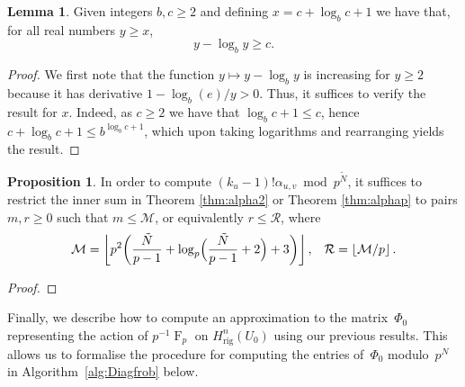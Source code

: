 \documentclass[a4paper,11pt]{article}
\numberwithin{equation}{section}
\providecommand{\floor}[1]{\left\lfloor#1\right\rfloor}   %
\DeclareMathOperator{\Frob}{F}           %
\providecommand{\Hrig}{H_{\text{rig}}}  %
\theoremstyle{definition}
\newtheorem{lem}[thm]{Lemma}
\newtheorem{prop}[thm]{Proposition}
\begin{document}
\begin{lem} \label{lem:log}
Given integers $b,c \geq 2$ and defining $x = c + \log_b c + 1$ 
we have that, for all real numbers $y \geq x$, 
\begin{equation*}
y - \log_b y \geq c.
\end{equation*}
\end{lem}

\begin{proof}
We first note that the function $y \mapsto y - \log_b y$ is increasing 
for $y \geq 2$ because it has derivative $1 - \log_b(e)/y > 0$.  Thus, it 
suffices to verify the result for $x$.  Indeed, as $c \geq 2$ we have 
that $\log_b c + 1 \leq c$, hence $c + \log_b c + 1 \leq b^{\log_b c + 1}$,
which upon taking logarithms and rearranging yields the result.
\end{proof}

\begin{prop} \label{prop:MR}
In order to compute $(k_u-1)!\alpha_{u,v} \bmod p^{\tilde{N}}$, it 
suffices to restrict the inner sum in Theorem \ref{thm:alpha2} or 
Theorem \ref{thm:alphap} to pairs $m,r \geq 0$ such that $m \leq \mathcal{M}$, or 
equivalently $r \leq \mathcal{R}$, where 
\begin{equation*}
\mathcal{M} = \floor{ p^2 \biggl( \frac{\tilde{N}}{p-1}
            + \log_p\Bigl(\frac{\tilde{N}}{p-1} + 2 \Bigr) + 3 \biggr)}, \; \; \; \mathcal{R}=\floor{\mathcal{M}/p}.
\end{equation*}
\end{prop}

\begin{proof}
\end{proof}

Finally, we describe how to compute an approximation to the matrix~$\Phi_0$ 
representing the action of $p^{-1} \Frob_p$ on $\Hrig^{n}(U_0)$ using our 
previous results. This allows us to formalise the procedure for computing 
the entries of~$\Phi_0$ modulo~$p^N$ in Algorithm~\ref{alg:Diagfrob} 
below.
\end{document}

